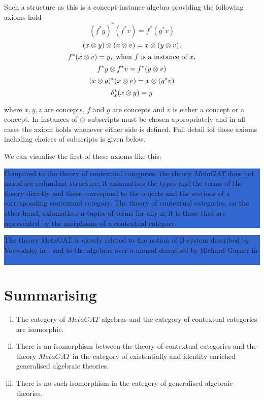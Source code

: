 \documentclass[10pt,a4paper]{article}
\newcommand{\highlightpara}[1]{\colorbox{highlight}{%
    \parbox{\dimexpr\linewidth-2\fboxsep}%
        {#1}}
}
\begin{document}
Such a structure as this is a concept-instance algebra providing the following axioms hold  
\begin{equation}
(f^*g)^*(f^*v) = f^*(g^*v)
\end{equation}
\begin{equation}
(x \otimes y) \otimes (x \otimes v) = x \otimes (y \otimes v), 
\end{equation}
\begin{equation}
f^*(x \otimes v) = y, \mbox{ when $f$ is a instance of $x$,} 
\end{equation}
\begin{equation}
f^*y \otimes f^*v = f^*(y \otimes v)
\end{equation}
\begin{equation}
(x \otimes g)^*(x \otimes v)=x \otimes(g^*v)
\end{equation}
\begin{equation}
\delta_x ^*(x \otimes y)=y
\end{equation}

where $x, y, z$ are concepts, $f$ and $g$ are concepts and $v$ is either a concept or a concept. In instances of $\otimes$ subscripts must be chosen appropriately
and in all cases the axiom holds whenever either side is defined. Full detail iof these axioms including choices of subscripts is given below.


We can visualise the first of these axioms like this: 



\noindent
\highlightpara{
Compared to the theory of contextual categories, the theory $MetaGAT$ does not introduce redundant structure; it axiomatises the types and the terms of the theory directly and these correspond to the objects and the sections of a corresponding contextual category. The theory of contextual categories, on the other hand, axiomatises n-tuples of terms for any n; it is  these that are represented by the morphisms of a contextual category.}  

\noindent
\highlightpara{
The theory MetaGAT is closely related to the notion of B-system described by Voevodsky in
\cite{Voevodsky14B}.
and to the algebras over a monad described by Richard Garner in \cite{Garner15}.  
}
\section{Summarising}

\begin{enumerate}[(i)]
\item The category of $MetaGAT$ algebras and the category of contextual categories are isomorphic. 
\item There is an isomorphism between the theory of contextual categories and the theory $MetaGAT$ in the category of existentially and identity enriched generalised algebraic theories. 
\item There is no such isomorphism in the category of generalised algebraic theories.
\end{enumerate}
\end{document}
